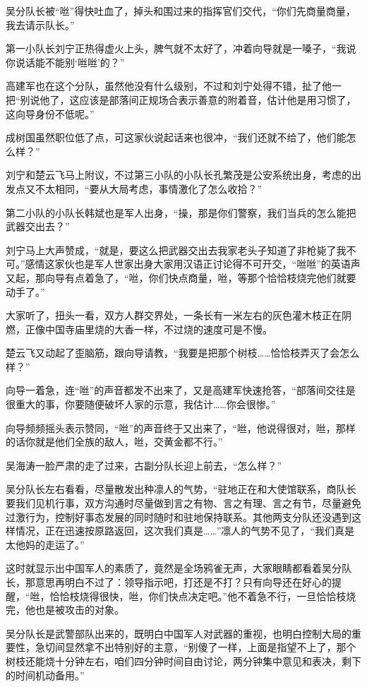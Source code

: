 吴分队长被“咝”得快吐血了，掉头和围过来的指挥官们交代，“你们先商量商量，我去请示队长。”

第一小队长刘宁正热得虚火上头，脾气就不太好了，冲着向导就是一嗓子，“我说你说话能不能别‘咝咝’的？”

高建军也在这个分队，虽然他没有什么级别，不过和刘宁处得不错，扯了他一把“别说他了，这应该是部落间正规场合表示善意的附着音，估计他是用习惯了，这向导身份不低呢。”

成树国虽然职位低了点，可这家伙说起话来也很冲，“我们还就不给了，他们能怎么样？”

刘宁和楚云飞马上附议，不过第三小队的小队长孔繁茂是公安系统出身，考虑的出发点又不太相同，“要从大局考虑，事情激化了怎么收拾？”

第二小队的小队长韩斌也是军人出身，“操，那是你们警察，我们当兵的怎么能把武器交出去？”

刘宁马上大声赞成，“就是，要这么把武器交出去我家老头子知道了非枪毙了我不可。”感情这家伙也是军人世家出身大家用汉语正讨论得不可开交，“咝咝”的英语声又起，那向导有点着急了，“咝，你们快点商量，咝，等那个恰恰枝烧完他们就要动手了。”

大家听了，扭头一看，双方人群交界处，一条长有一米左右的灰色灌木枝正在阴燃，正像中国寺庙里烧的大香一样，不过烧的速度可是不慢。

楚云飞又动起了歪脑筋，跟向导请教，“我要是把那个树枝……恰恰枝弄灭了会怎么样？”

向导一着急，连“咝”的声音都发不出来了，又是高建军快速抢答，“部落间交往是很重大的事，你要随便破坏人家的示意，我估计……你会很惨。”

向导频频摇头表示赞同，“咝”的声音终于又出来了，“咝，他说得很对，咝，那样的话你就是他们全族的敌人，咝，交黄金都不行。”

吴海涛一脸严肃的走了过来，古副分队长迎上前去，“怎么样？”

吴分队长左右看看，尽量散发出种凛人的气势，“驻地正在和大使馆联系，商队长要我们见机行事，双方沟通时尽量做到言之有物、言之有理、言之有节，尽量避免过激行为，控制好事态发展的同时随时和驻地保持联系。其他两支分队还没遇到这样情况，正在迅速按原路返回，这次我们真是……”凛人的气势不见了，“我们真是太他妈的走运了。”

这时就显示出中国军人的素质了，竟然是全场鸦雀无声，大家眼睛都看着吴分队长，那意思再明白不过了：领导指示吧，打还是不打？只有向导还在好心的提醒，“咝，恰恰枝烧得很快，咝，你们快点决定吧。”他不着急不行，一旦恰恰枝烧完，他也是被攻击的对象。

吴分队长是武警部队出来的，既明白中国军人对武器的重视，也明白控制大局的重要性，急切间显然拿不出特别好的主意，“别傻了一样，上面是指望不上了，那个树枝还能烧十分钟左右，咱们四分钟时间自由讨论，两分钟集中意见和表决，剩下的时间机动备用。”

